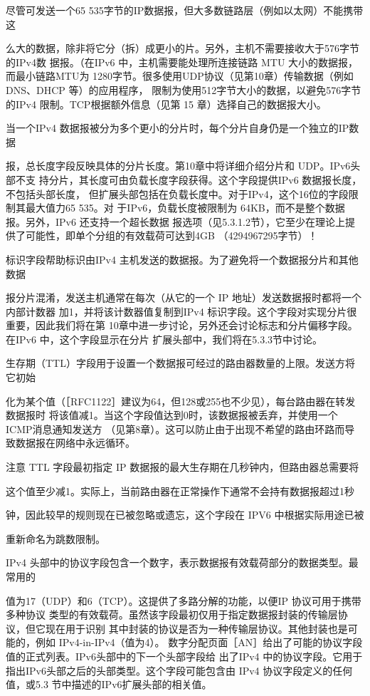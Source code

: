 尽管可发送一个65 535字节的IP数据报，但大多数链路层（例如以太网）不能携带这

么大的数据，除非将它分（拆）成更小的片。另外，主机不需要接收大于576字节的IPv4数
据报。（在IPv6 中，主机需要能处理所连接链路 MTU 大小的数据报，而最小链路MTU为
1280字节。很多使用UDP协议（见第10章）传输数据（例如 DNS、DHCP 等）的应用程序，
限制为使用512字节大小的数据，以避免576字节的IPv4 限制。TCP根据额外信息（见第
15 章）选择自己的数据报大小。

当一个IPv4 数据报被分为多个更小的分片时，每个分片自身仍是一个独立的IP数据

报，总长度字段反映具体的分片长度。第10章中将详细介绍分片和 UDP。IPv6头部不支
持分片，其长度可由负载长度字段获得。这个字段提供IPv6 数据报长度，不包括头部长度，
但扩展头部包括在负载长度中。对于IPv4，这个16位的字段限制其最大值力65 535。对
于IPv6，负载长度被限制为 64KB，而不是整个数据报。另外，IPv6 还支持一个超长数据
报选项（见5.3.1.2节），它至少在理论上提供了可能性，即单个分组的有效载荷可达到4GB
（4294967295字节）！

标识字段帮助标识由IPv4 主机发送的数据报。为了避免将一个数据报分片和其他数据

报分片混淆，发送主机通常在每次（从它的一个 IP 地址）发送数据报时都将一个内部计数器
加1，并将该计数器值复制到IPv4 标识字段。这个字段对实现分片很重要，因此我们将在第
10章中进一步讨论，另外还会讨论标志和分片偏移字段。在IPv6 中，这个字段显示在分片
扩展头部中，我们将在5.3.3节中讨论。

生存期（TTL）字段用于设置一个数据报可经过的路由器数量的上限。发送方将它初始

化为某个值（［RFC1122］建议为64，但128或255也不少见），每台路由器在转发数据报时
将该值减1。当这个字段值达到0时，该数据报被丢弃，并使用一个ICMP消息通知发送方
（见第8章）。这可以防止由于出现不希望的路由环路而导致数据报在网络中永远循环。

注意 TTL 字段最初指定 IP 数据报的最大生存期在几秒钟内，但路由器总需要将

这个值至少减1。实际上，当前路由器在正常操作下通常不会持有数据报超过1秒

钟，因此较早的规则现在已被忽略或遗忘，这个字段在 IPV6 中根据实际用途已被

重新命名为跳数限制。

IPv4 头部中的协议字段包含一个数字，表示数据报有效载荷部分的数据类型。最常用的

值为17（UDP）和6（TCP）。这提供了多路分解的功能，以便IP 协议可用于携带多种协议
类型的有效载荷。虽然该字段最初仅用于指定数据报封装的传输层协议，但它现在用于识别
其中封装的协议是否为一种传输层协议。其他封装也是可能的，例如 IPv4-in-IPv4（值为4）。
数字分配页面［AN］给出了可能的协议字段值的正式列表。IPv6头部中的下一个头部字段给
出了IPv4 中的协议字段。它用于指出IPv6头部之后的头部类型。这个字段可能包含由 IPv4
协议字段定义的任何值，或5.3 节中描述的IPv6扩展头部的相关值。

